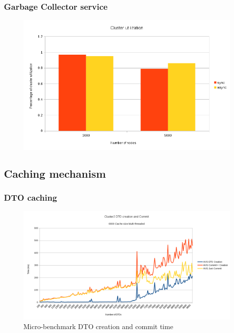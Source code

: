 \documentclass{beamer}
\begin{document}
\begin{frame}
\frametitle{Garbage Collector service}
\begin{figure}
\centering
  \includegraphics[scale=0.5]{resources/async_cluster_util.png}
\end{figure}
\end{frame}

\subsection{Caching mechanism}
\begin{frame}
\frametitle{DTO caching}

\begin{figure}
\centering
\includegraphics[scale=0.37]{resources/cache_create_commit.png}
\caption{Micro-benchmark DTO creation and commit time}
\end{figure}
\end{frame}
\end{document}
